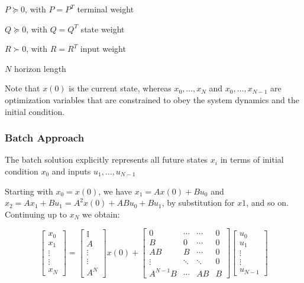 $P\succeq0$, with $P=P^T$
terminal weight

$Q\succeq0$, with $Q = Q^T$
state weight

$R\succ0$, with $R = R^T$
input weight

$N$ horizon length

Note that $x(0)$ is the current state, whereas
$x_0,\dots,x_N$ and $x_0,\dots,x_{N-1}$
are optimization variables that are constrained to obey
the system dynamics and the initial condition.

\subsubsection{Batch Approach}
The batch solution explicitly represents
all future states $x_i$ in terms of
initial condition $x_0$ and inputs $u_1,\dots,u_{N-1}$

Starting with $x_0 = x(0)$,
we have $x_1 = Ax(0) + Bu_0$ and
$x_2 = Ax_1 + Bu_1 = A^2 x(0) + ABu_0 + Bu_1$,
by substitution for $x1$, and so on.
Continuing up to $x_N$ we obtain:

$$ \begin{bmatrix}
		x_0    \\
		x_1    \\
		\vdots \\
		\vdots \\
		x_N
	\end{bmatrix}
	=
	\begin{bmatrix}
		\mathbb{I} \\
		A          \\
		\vdots     \\
		\vdots     \\
		A^N
	\end{bmatrix}
	x(0) +
	\begin{bmatrix}
		0        & \cdots & \cdots & 0 \\
		B        & 0      & \cdots & 0 \\
		AB       & B      & \cdots & 0 \\
		\vdots   & \ddots & \ddots & 0 \\
		A^{N-1}B & \cdots & AB     & B
	\end{bmatrix}
	\begin{bmatrix}
		u_0    \\
		u_1    \\
		\vdots \\
		\vdots \\
		u_{N-1}
	\end{bmatrix} $$

